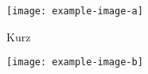\documentclass{scrartcl}
\begin{document}
\begin{figure}
	\centering
	\begin{minipage}[t]{0.5\textwidth}
		\centering
		\texttt{[image: example-image-a]}
		\caption{Kurz}
	\end{minipage}\hfill
	\begin{minipage}[t]{0.5\textwidth}
		\centering
		\texttt{[image: example-image-b]}
		\caption{\blindtext}
	\end{minipage}
\end{figure}
\end{document}
